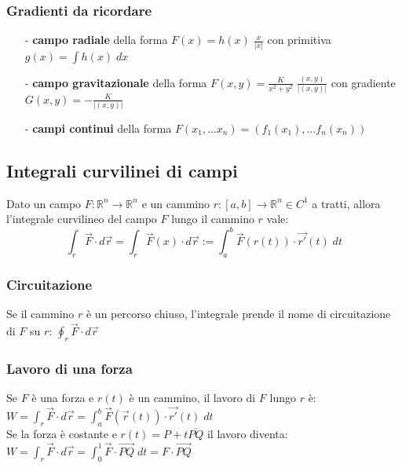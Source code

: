 \documentclass[a4paper]{article}
\newcommand\Rn{\mathbb{R}^n}  %
\begin{document}
\subsubsection*{Gradienti da ricordare}
\begin{itemize}[topsep=3pt, itemsep=0pt]
	\item[-] \textbf{campo radiale} della forma \(F(x) = h(x) \; \frac{x}{\left|x\right|}\) con primitiva \(g(x) = \int h(x) \; dx\)
	\item[-] \textbf{campo gravitazionale} della forma \(F(x,y) = \frac{K}{x^2 + y^2} \; \frac{(x,y)}{\left|(x,y)\right|}\) con gradiente \(G(x,y) = -\frac{K}{\left|(x,y)\right|}\)
	\item[-] \textbf{campi continui} della forma \(F(x_1, \dots x_n) = (f_1(x_1), \dots f_n(x_n))\)
\end{itemize}

\subsection{Integrali curvilinei di campi}
Dato un campo \(F : \Rn \to \Rn\) e un cammino \(r : [a,b] \to \Rn \in C^1\) a tratti, allora l'integrale curvilineo del campo
\(F\) lungo il cammino \(r\) vale:
\[\int_{r} \vec{F} \cdot d \vec{r} = \int_{r} \vec{F}(x) \cdot d\vec{r} := \int_a^b \vec{F}(r(t)) \cdot \vec{r'}(t) \; dt\]

\subsubsection*{Circuitazione}
Se il cammino \(r\) è un percorso chiuso, l'integrale prende il nome di circuitazione di \(F\) su \(r\): \(\displaystyle \oint_r \vec{F} \cdot d\vec{r}\)

\subsubsection*{Lavoro di una forza}
Se \(F\) è una forza e \(r(t)\) è un cammino, il lavoro di \(F\) lungo \(r\) è: \(\displaystyle W = \int_r \vec{F} \cdot d\vec{r} = \int_a^b \vec{F}(\vec{r}(t)) \cdot \vec{r'}(t) \; dt\) \\
Se la forza è costante e \(r(t) = P + t \overline{PQ}\) il lavoro diventa: \(\displaystyle W = \int_r \vec{F} \cdot d\vec{r} = \int_0^1 \vec{F} \cdot \overrightarrow{PQ} \; dt = F \cdot \overrightarrow{PQ}\)
\end{document}
